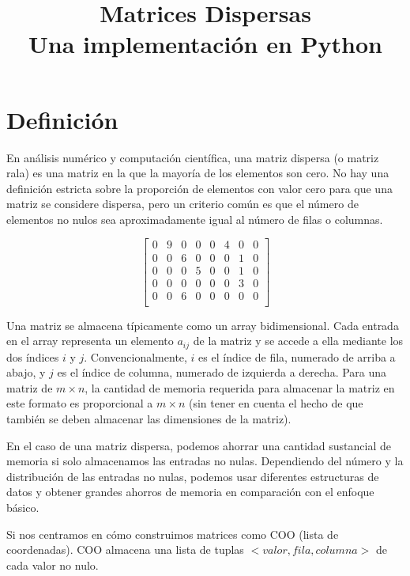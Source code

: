 \documentclass[10pt,a4paper]{article}
\title{{\huge Matrices Dispersas} \\ Una implementación en Python}
\date{}
\begin{document}
\maketitle

\section{Definición}
En análisis numérico y computación científica, una matriz dispersa (o matriz rala) es una matriz en la que la mayoría de los elementos son cero. No hay una definición estricta sobre la proporción de elementos con valor cero para que una matriz se considere dispersa, pero un criterio común es que el número de elementos no nulos sea aproximadamente igual al número de filas o columnas.

\begin{equation*}
\begin{bmatrix}
	0 & 9  & 0 & 0 & 0 & 4 & 0 & 0 \\
	0 & 0  & 6 & 0 & 0 & 0 & 1 & 0 \\
	0 & 0  & 0 & 5 & 0 & 0 & 1 & 0 \\
    0 & 0  & 0 & 0 & 0 & 0 & 3 & 0 \\
    0 & 0  & 6 & 0 & 0 & 0 & 0 & 0 \\
\end{bmatrix}
\end{equation*}

Una matriz se almacena típicamente como un array bidimensional. Cada entrada en el array representa un elemento $a_{ij}$ de la matriz y se accede a ella mediante los dos índices $i$ y $j$. Convencionalmente, $i$ es el índice de fila, numerado de arriba a abajo, y $j$ es el índice de columna, numerado de izquierda a derecha. Para una matriz de $m × n$, la cantidad de memoria requerida para almacenar la matriz en este formato es proporcional a $m × n$ (sin tener en cuenta el hecho de que también se deben almacenar las dimensiones de la matriz).

En el caso de una matriz dispersa, podemos ahorrar una cantidad sustancial de memoria si solo almacenamos las entradas no nulas. Dependiendo del número y la distribución de las entradas no nulas, podemos usar diferentes estructuras de datos y obtener grandes ahorros de memoria en comparación con el enfoque básico.

Si nos centramos en cómo construimos matrices como COO (lista de coordenadas). COO almacena una lista de tuplas $<valor, fila, columna>$ de cada valor no nulo.
\end{document}
